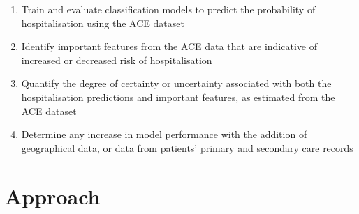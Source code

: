 \begin{enumerate}
    \item Train and evaluate classification models to predict the probability of hospitalisation using the ACE dataset
    \item Identify important features from the ACE data that are
    indicative of increased or decreased risk of hospitalisation
    \item Quantify the degree of certainty or uncertainty associated with
    both the hospitalisation predictions and important features, as
    estimated from the ACE dataset
    \item Determine any increase in model performance with the addition of geographical data, or data from patients' primary and secondary care records
\end{enumerate}

\section*{Approach}\label{sec:approach}

